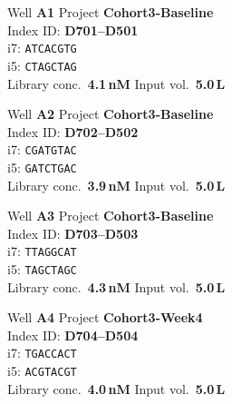 \begin{minipage}[t]{0.47\linewidth}
\begin{samplecard}[VX-2201]
\footnotesize
Well \textbf{A1} \hfill Project \textbf{Cohort3-Baseline}\\[3pt]
Index ID: \textbf{D701--D501}\\[2pt]
i7: \bA\bT\bC\bA\bC\bG\bT\bG \texttt{ATCACGTG}\\[3pt]
i5: \bC\bT\bA\bG\bC\bT\bA\bG \texttt{CTAGCTAG}\\[3pt]
Library conc.\ \textbf{4.1\,nM} \hfill Input vol.\ \textbf{5.0\,\textmu L}
\end{samplecard}
\end{minipage}\hfill
\begin{minipage}[t]{0.47\linewidth}
\begin{samplecard}[VX-2202]
\footnotesize
Well \textbf{A2} \hfill Project \textbf{Cohort3-Baseline}\\[3pt]
Index ID: \textbf{D702--D502}\\[2pt]
i7: \bC\bG\bA\bT\bG\bT\bA\bC \texttt{CGATGTAC}\\[3pt]
i5: \bG\bA\bT\bC\bT\bG\bA\bC \texttt{GATCTGAC}\\[3pt]
Library conc.\ \textbf{3.9\,nM} \hfill Input vol.\ \textbf{5.0\,\textmu L}
\end{samplecard}
\end{minipage}
\par\vspace{6pt}

\begin{minipage}[t]{0.47\linewidth}
\begin{samplecard}[VX-2203]
\footnotesize
Well \textbf{A3} \hfill Project \textbf{Cohort3-Baseline}\\[3pt]
Index ID: \textbf{D703--D503}\\[2pt]
i7: \bT\bT\bA\bG\bG\bC\bA\bT \texttt{TTAGGCAT}\\[3pt]
i5: \bT\bA\bG\bC\bT\bA\bG\bC \texttt{TAGCTAGC}\\[3pt]
Library conc.\ \textbf{4.3\,nM} \hfill Input vol.\ \textbf{5.0\,\textmu L}
\end{samplecard}
\end{minipage}\hfill
\begin{minipage}[t]{0.47\linewidth}
\begin{samplecard}[VX-2204]
\footnotesize
Well \textbf{A4} \hfill Project \textbf{Cohort3-Week4}\\[3pt]
Index ID: \textbf{D704--D504}\\[2pt]
i7: \bT\bG\bA\bC\bC\bA\bC\bT \texttt{TGACCACT}\\[3pt]
i5: \bA\bC\bG\bT\bA\bC\bG\bT \texttt{ACGTACGT}\\[3pt]
Library conc.\ \textbf{4.0\,nM} \hfill Input vol.\ \textbf{5.0\,\textmu L}
\end{samplecard}
\end{minipage}
\par\vspace{6pt}

